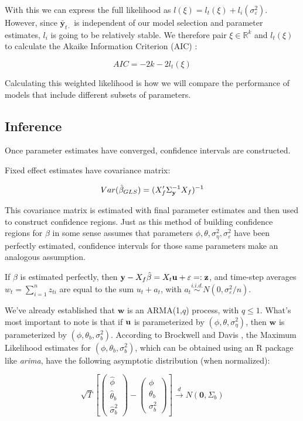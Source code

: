 With this we can express the full likelihood as $l(\xi) = l_t(\xi) + l_i(\sigma_\varepsilon^2)$. However, since $\bar{\mathbf{y}}_{t\cdot}$ is independent of our model selection and parameter estimates, $l_i$ is going to be relatively stable. We therefore pair $\xi \in \mathbb{R}^k$ and $l_t(\xi)$ to calculate the Akaike Information Criterion (AIC) \cite{akaike}: 

$$ AIC = -2k -2l_t(\xi) $$

Calculating this weighted likelihood is how we will compare the performance of models that include different subsets of parameters.

\subsection{Inference}

Once parameter estimates have converged, confidence intervals are constructed. 

Fixed effect estimates have covariance matrix:

\begin{equation}
    Var(\hat{\beta}_{GLS}) = (X_f'\Sigma_{\mathbf{y}}^{-1}X_f)^{-1}
    \label{eq:var_beta_gls}
\end{equation}

This covariance matrix is estimated with final parameter estimates and then used to construct confidence regions. Just as this method of
building confidence regions for $\beta$ in some sense assumes that parameters $\phi, \theta,\sigma_\eta^2, \sigma_\varepsilon^2$ have been 
perfectly estimated, confidence intervals for those same parameters make an analogous assumption.

If $\beta$ is estimated perfectly, then $\mathbf{y} - X_f\hat{\beta} = X_t \mathbf{u} + \varepsilon =: \mathbf{z}$, 
and time-step averages $w_t = \sum_{i=1}^n z_{ti}$ are equal to the sum $u_t + a_t$, with $a_t \overset{i.i.d.}{\sim} N(0,\sigma_\varepsilon^2/n)$.

We've already established that $\mathbf{w}$ is an ARMA(1,$q$) process, with $q \leq 1$. What's most important to note is that if $\mathbf{u}$ is parameterized by $(\phi,\theta,\sigma_\eta^2)$, then $\mathbf{w}$ is parameterized by
$(\phi,\theta_b,\sigma_b^2)$. According to Brockwell and Davis \cite{BrockwellDavis1991}, the Maximum Likelihood estimates for $(\phi, \theta_b, \sigma_b^2)$, which can
be obtained using an R package like \textit{arima}, have the following asymptotic distribution (when normalized):

$$\sqrt{T}\left[\left(\begin{array}{c}
     \hat{\phi}  \\
     \hat{\theta}_b \\
     \hat{\sigma}_b^2   
\end{array}\right) - \left(\begin{array}{c}
     {\phi}  \\
     {\theta}_b \\
     {\sigma}_b^2
\end{array}\right)\right] \xrightarrow{d}N(\mathbf{0}, \Sigma_b)$$

